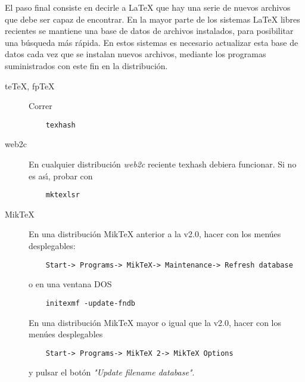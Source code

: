 	El paso final consiste en decirle a \LaTeX{} que hay una serie de
	nuevos archivos que debe ser capaz de encontrar. En la mayor parte
	de los sistemas \LaTeX{} libres recientes se mantiene una base de
	datos de archivos instalados, para posibilitar una b\'usqueda m\'as
	r\'apida. En estos sistemas es necesario actualizar esta base de datos
	cada vez que se instalan nuevos archivos, mediante los programas
	suministrados con este fin en la distribuci\'on.
	\begin{description}
	\item[te\TeX{}, fp\TeX{}] \mbox{}

	Correr
	\begin{verbatim}
	texhash
	\end{verbatim}
	\item[web2c] \mbox{}

	En cualquier distribuci\'on {\itshape web2c\/} reciente
	{\ttfamily texhash} debiera funcionar. Si no es as\'\i{}, probar con
	\begin{verbatim}
	mktexlsr
	\end{verbatim}

	\item[Mik\TeX{}] \mbox{}

	En una distribuci\'on Mik\TeX{} anterior a la v2.0,
	hacer con los men\'ues desplegables:
	\begin{verbatim}
	Start-> Programs-> MikTeX-> Maintenance-> Refresh database
	\end{verbatim}
 	o en una ventana DOS
	\begin{verbatim}
	initexmf -update-fndb
	\end{verbatim}
 	En una distribuci\'on Mik\TeX{} mayor o igual que la v2.0, hacer
	con los men\'ues desplegables
	\begin{verbatim}
	Start-> Programs-> MikTeX 2-> MikTeX Options
	\end{verbatim}
 	y pulsar el bot\'on {\itshape "Update filename database"\/}.
	
	\end{description}




